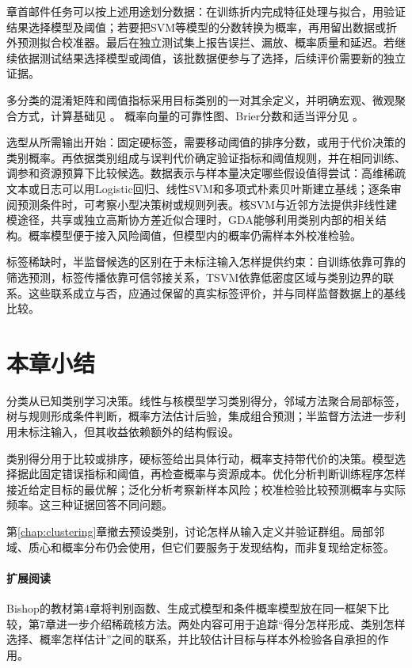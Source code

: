 章首邮件任务可以按上述用途划分数据：在训练折内完成特征处理与拟合，用验证结果选择模型及阈值；若要把SVM等模型的分数转换为概率，再用留出数据或折外预测拟合校准器。最后在独立测试集上报告误拦、漏放、概率质量和延迟。若继续依据测试结果选择模型或阈值，该批数据便参与了选择，后续评价需要新的独立证据。

多分类的混淆矩阵和阈值指标采用目标类别的一对其余定义，并明确宏观、微观聚合方式，计算基础见
。
概率向量的可靠性图、Brier分数和适当评分见
。

选型从所需输出开始：固定硬标签，需要移动阈值的排序分数，或用于代价决策的类别概率。再依据类别组成与误判代价确定验证指标和阈值规则，并在相同训练、调参和资源预算下比较候选。数据表示与样本量决定哪些假设值得尝试：高维稀疏文本或日志可以用Logistic回归、线性SVM和多项式朴素贝叶斯建立基线；逐条审阅预测条件时，可考察小型决策树或规则列表。核SVM与近邻方法提供非线性建模途径，共享或独立高斯协方差近似合理时，GDA能够利用类别内部的相关结构。概率模型便于接入风险阈值，但模型内的概率仍需样本外校准检验。

标签稀缺时，半监督候选的区别在于未标注输入怎样提供约束：自训练依靠可靠的筛选预测，标签传播依靠可信邻接关系，TSVM依靠低密度区域与类别边界的联系。这些联系成立与否，应通过保留的真实标签评价，并与同样监督数据上的基线比较。

\section{本章小结}
\label{sec:classification-summary}

分类从已知类别学习决策。线性与核模型学习类别得分，邻域方法聚合局部标签，树与规则形成条件判断，概率方法估计后验，集成组合预测；半监督方法进一步利用未标注输入，但其收益依赖额外的结构假设。

类别得分用于比较或排序，硬标签给出具体行动，概率支持带代价的决策。模型选择据此固定错误指标和阈值，再检查概率与资源成本。优化分析判断训练程序怎样接近给定目标的最优解；泛化分析考察新样本风险；校准检验比较预测概率与实际频率。这三种证据回答不同问题。

第\ref{chap:clustering}章撤去预设类别，讨论怎样从输入定义并验证群组。局部邻域、质心和概率分布仍会使用，但它们要服务于发现结构，而非复现给定标签。

\paragraph{扩展阅读}
Bishop的教材第4章将判别函数、生成式模型和条件概率模型放在同一框架下比较，第7章进一步介绍稀疏核方法。两处内容可用于追踪“得分怎样形成、类别怎样选择、概率怎样估计”之间的联系，并比较估计目标与样本外检验各自承担的作用。
